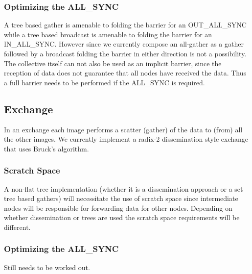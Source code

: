 \documentclass[times,10pt]{article}
\begin{document}
\subsubsection{Optimizing the ALL\_SYNC}
A tree based gather is amenable to folding the barrier for an OUT\_ALL\_SYNC while a tree based broadcast is amenable to folding the barrier for an IN\_ALL\_SYNC. However since we currently compose an all-gather as a gather followed by a broadcast folding the barrier in either direction is not a possibility. The collective itself can not also be used as an implicit barrier, since the reception of data does not guarantee that all nodes have received the data. Thus a full barrier needs to be performed if the ALL\_SYNC is required. 

\subsection{Exchange}
In an exchange each image performs a scatter (gather) of the data to (from) all the other images. We currently implement a radix-2 dissemination style exchange that uses Bruck's algorithm. 


\subsubsection{Scratch Space}
A non-flat tree implementation (whether it is a dissemination approach or a set tree based gathers) will necessitate the use of scratch space since intermediate nodes will be responsible for forwarding data for other nodes. Depending on whether dissemination or trees are used the scratch space requirements will be different.

\subsubsection{Optimizing the ALL\_SYNC} 
Still needs to be worked out.


%
%
%
%
%
%
%
%
\end{document}
